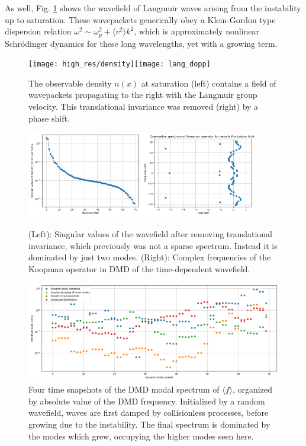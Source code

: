 \documentclass{article}
\begin{document}
As well, Fig. \ref{density} shows the wavefield of Langmuir waves arising from the instability up to saturation. These wavepackets generically obey a Klein-Gordon type dispersion relation $\omega^2 \sim \omega_p^2 + \langle v^2\rangle k^2$, which is approximately nonlinear Schr\"{o}dinger dynamics for these long wavelengths, yet with a growing term.
\begin{figure}[t]
  \centering
  \texttt{[image: high\_res/density]}\texttt{[image: lang\_dopp]}
  \caption{The observable density $n(x)$ at saturation (left) contains a field of wavepackets propagating to the right with the Langmuir group velocity. This translational invariance was removed (right) by a phase shift.}\label{density}
\end{figure}
\begin{figure}
  \centering
  \includegraphics[width=0.45\textwidth]{density/density_svs_groupframe}\includegraphics[width=0.45\textwidth]{density/density_dmd_freqs_zoom}
  \caption{(Left): Singular values of the wavefield after removing translational invariance, which previously was not a sparse spectrum. Instead it is dominated by just two modes. (Right): Complex frequencies of the Koopman operator in DMD of the time-dependent wavefield.}\label{density_dmd}
\end{figure}
\begin{figure}
  \centering
  \includegraphics[width=\textwidth]{density/density_dmd_modes}
  \caption{Four time snapshots of the DMD modal spectrum of $\langle f\rangle$, organized by absolute value of the DMD frequency. Initialized by a random wavefield, waves are first damped by collisionless processes, before growing due to the instability. The final spectrum is dominated by the modes which grew, occupying the higher modes seen here.}
\end{figure}
\end{document}
